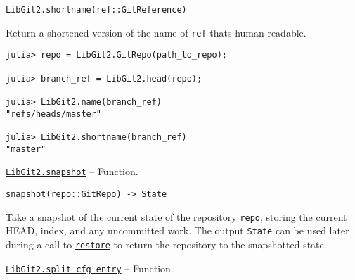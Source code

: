 \begin{adjustwidth}{2em}{0pt}


\begin{verbatim}
LibGit2.shortname(ref::GitReference)
\end{verbatim}

Return a shortened version of the name of \texttt{ref} that{\textquotesingle}s {\textquotedbl}human-readable{\textquotedbl}.


\begin{verbatim}
julia> repo = LibGit2.GitRepo(path_to_repo);

julia> branch_ref = LibGit2.head(repo);

julia> LibGit2.name(branch_ref)
"refs/heads/master"

julia> LibGit2.shortname(branch_ref)
"master"
\end{verbatim}



\end{adjustwidth}
\hypertarget{5664620894068288269}{} 
\hyperlink{5664620894068288269}{\texttt{LibGit2.snapshot}}  -- {Function.}

\begin{adjustwidth}{2em}{0pt}


\begin{verbatim}
snapshot(repo::GitRepo) -> State
\end{verbatim}

Take a snapshot of the current state of the repository \texttt{repo}, storing the current HEAD, index, and any uncommitted work. The output \texttt{State} can be used later during a call to \hyperlink{1068934750891016732}{\texttt{restore}} to return the repository to the snapshotted state.



\end{adjustwidth}
\hypertarget{709196314204873648}{} 
\hyperlink{709196314204873648}{\texttt{LibGit2.split\_cfg\_entry}}  -- {Function.}

